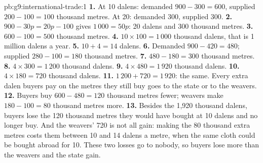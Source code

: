\begin{solution}{pb:g9:international-trade:1}
\textbf{1.} At 10 dalens: demanded $900 - 300 = 600$, supplied $200 - 100 = 100$ thousand metres. At 20:
demanded $300$, supplied $300$.
\textbf{2.} $900 - 30p = 20p - 100$ gives $1\,000 = 50p$: 20 dalens and 300 thousand metres.
\textbf{3.} $600 - 100 = 500$ thousand metres.
\textbf{4.} $10 \times 100 = 1\,000$ thousand dalens, that is 1 million dalens a year.
\textbf{5.} $10 + 4 = 14$ dalens.
\textbf{6.} Demanded $900 - 420 = 480$; supplied $280 - 100 = 180$ thousand metres.
\textbf{7.} $480 - 180 = 300$ thousand metres.
\textbf{8.} $4 \times 300 = 1\,200$ thousand dalens.
\textbf{9.} $4 \times 480 = 1\,920$ thousand dalens.
\textbf{10.} $4 \times 180 = 720$ thousand dalens.
\textbf{11.} $1\,200 + 720 = 1\,920$: the same. Every extra dalen buyers pay on the metres they still buy goes
to the state or to the weavers.
\textbf{12.} Buyers buy $600 - 480 = 120$ thousand metres fewer; weavers make $180 - 100 = 80$ thousand
metres more.
\textbf{13.} Besides the 1,920 thousand dalens, buyers lose the 120 thousand metres they would have bought at
10 dalens and no longer buy. And the weavers' 720 is not all gain: making the 80 thousand extra metres costs
them between 10 and 14 dalens a metre, when the same cloth could be bought abroad for 10. These two losses
go to nobody, so buyers lose more than the weavers and the state gain.
\end{solution}

